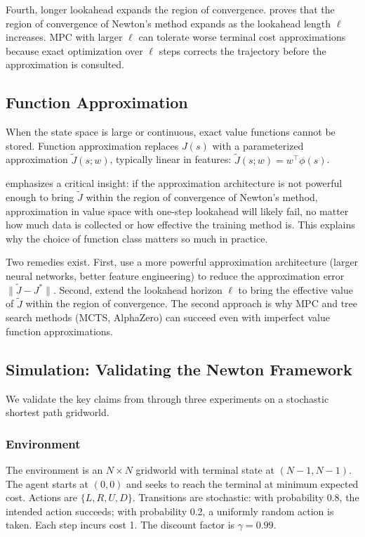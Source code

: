 Fourth, longer lookahead expands the region of convergence. \citet{bertsekas2024} proves that the region of convergence of Newton's method expands as the lookahead length $\ell$ increases. MPC with larger $\ell$ can tolerate worse terminal cost approximations because exact optimization over $\ell$ steps corrects the trajectory before the approximation is consulted.


\subsection{Function Approximation}
\label{sec:function_approx}

When the state space is large or continuous, exact value functions cannot be stored. Function approximation replaces $J(s)$ with a parameterized approximation $\tilde{J}(s; w)$, typically linear in features: $\tilde{J}(s; w) = w^\top \phi(s)$.

\citet{bertsekas2024} emphasizes a critical insight: if the approximation architecture is not powerful enough to bring $\tilde{J}$ within the region of convergence of Newton's method, approximation in value space with one-step lookahead will likely fail, no matter how much data is collected or how effective the training method is. This explains why the choice of function class matters so much in practice.

Two remedies exist. First, use a more powerful approximation architecture (larger neural networks, better feature engineering) to reduce the approximation error $\|\tilde{J} - J^*\|$. Second, extend the lookahead horizon $\ell$ to bring the effective value of $\tilde{J}$ within the region of convergence. The second approach is why MPC and tree search methods (MCTS, AlphaZero) can succeed even with imperfect value function approximations.


\subsection{Simulation: Validating the Newton Framework}
\label{sec:simulation}

We validate the key claims from \citet{bertsekas2024} through three experiments on a stochastic shortest path gridworld.

\subsubsection{Environment}

The environment is an $N \times N$ gridworld with terminal state at $(N-1, N-1)$. The agent starts at $(0,0)$ and seeks to reach the terminal at minimum expected cost. Actions are $\{L, R, U, D\}$. Transitions are stochastic: with probability 0.8, the intended action succeeds; with probability 0.2, a uniformly random action is taken. Each step incurs cost 1. The discount factor is $\gamma = 0.99$.

